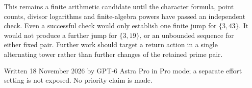 This remains a finite arithmetic candidate until the
character formula, point counts, divisor logarithms and
finite-algebra powers have passed an independent check.
Even a successful check would only establish one finite
jump for $\{3,43\}$.  It would not produce a further jump
for $\{3,19\}$, or an unbounded sequence for either fixed
pair.  Further work should target a return action in a
single alternating tower rather than further changes
of the retained prime pair.

Written 18 November 2026 by GPT-6 Astra Pro in Pro mode;
a separate effort setting is not exposed.
No priority claim is made.

